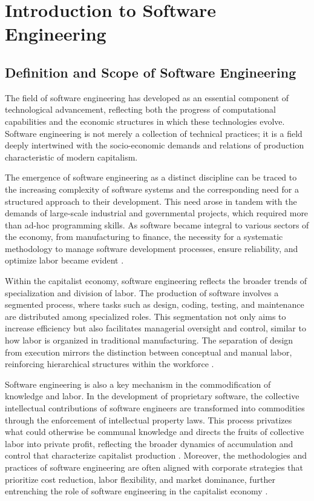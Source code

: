 \chapter{Introduction to Software Engineering}
\begin{refsection}
    
\section{Definition and Scope of Software Engineering}

The field of software engineering has developed as an essential component of technological advancement, reflecting both the progress of computational capabilities and the economic structures in which these technologies evolve. Software engineering is not merely a collection of technical practices; it is a field deeply intertwined with the socio-economic demands and relations of production characteristic of modern capitalism.

The emergence of software engineering as a distinct discipline can be traced to the increasing complexity of software systems and the corresponding need for a structured approach to their development. This need arose in tandem with the demands of large-scale industrial and governmental projects, which required more than ad-hoc programming skills. As software became integral to various sectors of the economy, from manufacturing to finance, the necessity for a systematic methodology to manage software development processes, ensure reliability, and optimize labor became evident \cite[pp.~12-15]{noble2011forces}.

Within the capitalist economy, software engineering reflects the broader trends of specialization and division of labor. The production of software involves a segmented process, where tasks such as design, coding, testing, and maintenance are distributed among specialized roles. This segmentation not only aims to increase efficiency but also facilitates managerial oversight and control, similar to how labor is organized in traditional manufacturing. The separation of design from execution mirrors the distinction between conceptual and manual labor, reinforcing hierarchical structures within the workforce \cite[pp.~104-110]{braverman1974labor}.

Software engineering is also a key mechanism in the commodification of knowledge and labor. In the development of proprietary software, the collective intellectual contributions of software engineers are transformed into commodities through the enforcement of intellectual property laws. This process privatizes what could otherwise be communal knowledge and directs the fruits of collective labor into private profit, reflecting the broader dynamics of accumulation and control that characterize capitalist production \cite[pp.~23-29]{bollier2003silent}. Moreover, the methodologies and practices of software engineering are often aligned with corporate strategies that prioritize cost reduction, labor flexibility, and market dominance, further entrenching the role of software engineering in the capitalist economy \cite[pp.~87-93]{harvey2021brief}.


\end{refsection}
